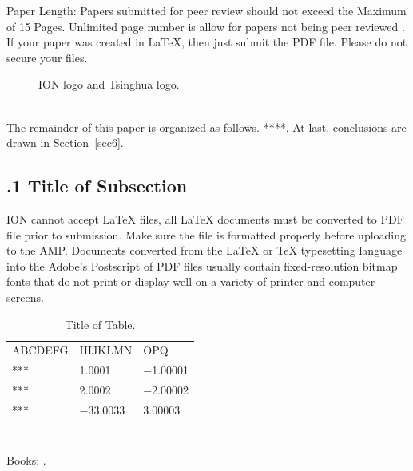 \documentclass[a4paper,notitlepage,onecolumn,10pt]{article}
\begin{document}
Paper Length: Papers submitted for peer review should not exceed the Maximum of 15 Pages.  Unlimited page number is allow for papers not being peer reviewed . If your paper was created in {\LaTeX}, then just submit the PDF file. Please do not secure your files. \\
\begin{figure}[hbtp]
	\centering
	\quad
	\caption{ION logo and Tsinghua logo.}
	\label{fig.1}
\end{figure}
~\\
The remainder of this paper is organized as follows. ****. At last, conclusions are drawn in Section~{\ref{sec6}}.

\subsection{\textbf{.1 Title of Subsection}}

ION cannot accept {\LaTeX} files, all {\LaTeX}  documents must be converted to PDF file prior to submission. Make sure the file is formatted properly before uploading to the AMP.  Documents converted from the {\LaTeX} or {\TeX} typesetting language into the Adobe’s Postscript of PDF files usually contain fixed-resolution bitmap fonts that do not print or display well on a variety of printer and computer screens. \\
\begin{table}[!htb]
	\centering
	\caption{Title of Table.}
	\vspace{-7pt}
	\begin{tabular}{ L{3cm}|R{2.5cm}  R{2.5cm} }
		\Xhline{1pt}
		ABCDEFG &  HIJKLMN &  OPQ\\
		\Xhline{1pt}
		*** & 1.0001 & $ -$1.00001  \\
		\hline
		*** &  2.0002 & $ -$2.00002 \\
		\hline
		*** & $ -$33.0033  & 3.00003\\
		\Xhline{1pt}
	\end{tabular}
	\label{tab2}
\end{table}
~\\
Books: \cite{Kay1998,kaplan2005,xiegang2009}.\\
\end{document}
